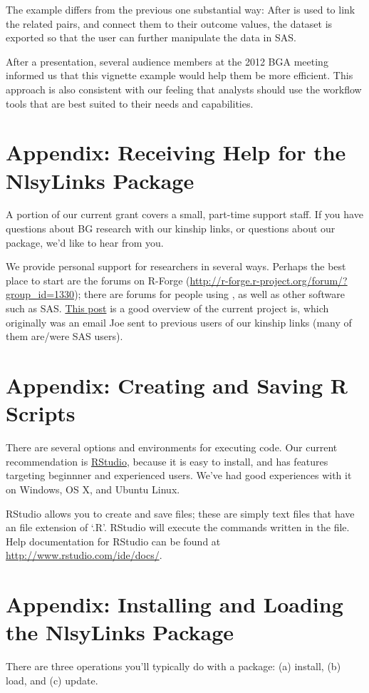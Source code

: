 \documentclass{article}\usepackage[]{graphicx}\usepackage[]{color}
\begin{document}
The example differs from the previous one substantial way: After \R{} is used to link the related pairs, and connect them to their outcome values, the dataset is exported so that the user can further manipulate the data in SAS.  

After a presentation, several audience members at the 2012 BGA meeting informed us that this vignette example would help them be more efficient.  This approach is also consistent with our feeling that analysts should use the workflow tools that are best suited to their needs and capabilities.

\appendix
\section{Appendix: Receiving Help for the NlsyLinks Package}
\label{sec:ReceivingHelp} A portion of our current grant covers a small, part-time support
staff.  If you have questions about BG research with our kinship links, or
questions about our package, we'd like to hear from you.

We provide personal support for researchers in several ways.  Perhaps the best
place to start are the forums on R-Forge
(\url{http://r-forge.r-project.org/forum/?group_id=1330}); there are forums for
people using \R{}, as well as other software such as SAS.  \href{https://r-forge.r-project.org/forum/forum.php?thread_id=4537&forum_id=4266&group_id=1330}{This
post} is a good overview of the current project is, which originally was an
email Joe sent to previous users of our kinship links (many of them are/were SAS
users).

\section{Appendix: Creating and Saving R Scripts}
\label{sec:RScripts} There are several options and environments for executing \R{} code.  Our current
recommendation is \href{http://rstudio.org/}{RStudio}, because it is easy to
install, and has features targeting beginnner and experienced \R{} users. 
We've had good experiences with it on Windows, OS X, and Ubuntu Linux.

RStudio allows you to create and save \R{} files; these are simply text files
that have an file extension of `.R'.  RStudio will execute the commands written
in the file.  Help documentation for RStudio can be found at
\url{http://www.rstudio.com/ide/docs/}.

\section{Appendix: Installing and Loading the NlsyLinks Package} \label{sec:InstallingPackage}
There are three operations you'll typically do with a package: (a) install, (b) load, and (c) update.
\end{document}
